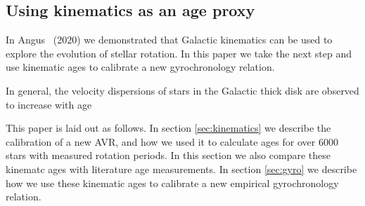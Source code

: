 
\subsection{Using kinematics as an age proxy}

In Angus \etal\ (2020) we demonstrated that Galactic kinematics can be used to
explore the evolution of stellar rotation.
In this paper we take the next step and use kinematic ages to calibrate a new
gyrochronology relation.

In general, the velocity dispersions of stars in the Galactic thick disk are
observed to increase with age \citep[\eg][]{casagrande2011, aumer2009}

This paper is laid out as follows.
In section \ref{sec:kinematics} we describe the calibration of a new AVR, and
how we used it to calculate ages for over 6000 stars with measured rotation
periods.
In this section we also compare these kinematc ages with literature age
measurements.
In section \ref{sec:gyro} we describe how we use these kinematic ages to
calibrate a new empirical gyrochronology relation.
